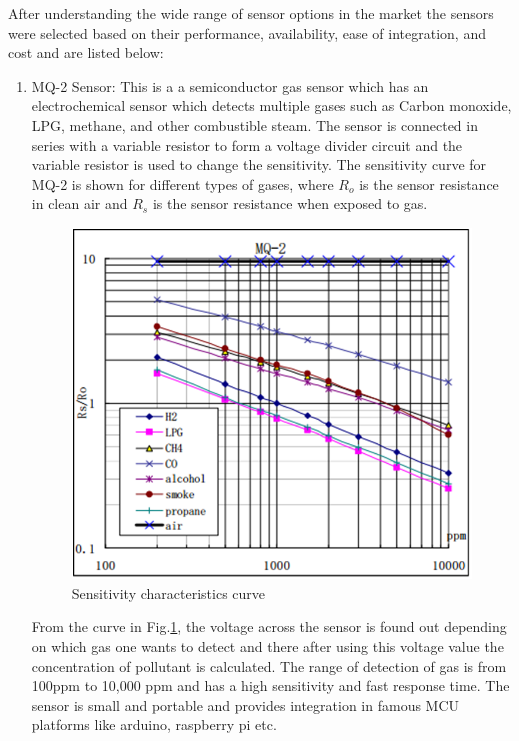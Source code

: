  After understanding the wide range of sensor options in the market the sensors were selected based on their performance, availability, ease of integration, and cost and are listed below: 
 \begin{enumerate}

  \item MQ-2 Sensor: This is a a semiconductor gas sensor which has an electrochemical sensor which detects multiple gases such as Carbon monoxide, LPG, methane, and other combustible steam. The sensor is connected in series with a variable resistor to form a voltage divider circuit and the variable resistor is used to change the sensitivity. The sensitivity curve for MQ-2 is shown for different types of gases, where $R_{o}$ is the sensor resistance in clean air and $R_{s}$ is the sensor resistance when exposed to gas.
\par
\begin{figure}[h]
  \begin{center}
  \includegraphics[scale=0.40]{./images/figure1.png}
  \end{center}
 
  \caption{Sensitivity characteristics curve \cite{Data2012}}
  
  \label{curve}

\end{figure}
From the curve in Fig.\ref{curve}, the voltage across the sensor is found out depending on which gas one wants to detect and there after using this voltage value the concentration of pollutant is calculated. The range of detection of gas is from 100ppm to 10,000 ppm and has a high sensitivity and fast response time. The sensor is small and portable and provides integration in famous MCU platforms like arduino, raspberry pi etc. 


\end{enumerate}

